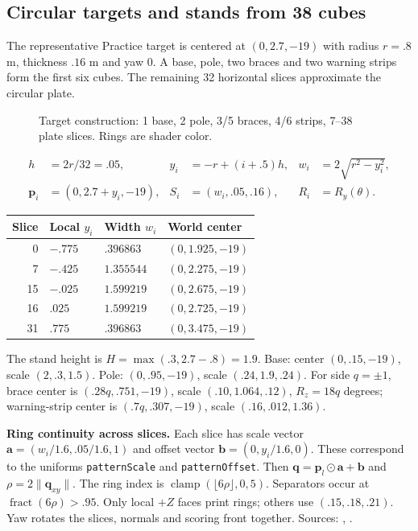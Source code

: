 \subsection{Circular targets and stands from 38 cubes}
The representative Practice target is centered at $(0,2.7,-19)$ with radius $r=.8$ m, thickness $.16$ m and yaw 0. A base, pole, two braces and two warning strips form the first six cubes. The remaining 32 horizontal slices approximate the circular plate.
\begin{figure}[htbp]

\caption{Target construction: 1 base, 2 pole, 3/5 braces, 4/6 strips, 7--38 plate slices. Rings are shader color.}
\end{figure}
\begin{align}
 h&=2r/32=.05, & y_i&=-r+(i+.5)h, & w_i&=2\sqrt{r^2-y_i^2},\\
 \mathbf p_i&=(0,2.7+y_i,-19), & S_i&=(w_i,.05,.16), & R_i&=R_y(\theta).
\end{align}
\begin{center}\begin{tabular}{rlll}\toprule
Slice & Local $y_i$ & Width $w_i$ & World center \\\midrule
0 & $-.775$ & $.396863$ & $(0,1.925,-19)$\\
7 & $-.425$ & $1.355544$ & $(0,2.275,-19)$\\
15 & $-.025$ & $1.599219$ & $(0,2.675,-19)$\\
16 & $.025$ & $1.599219$ & $(0,2.725,-19)$\\
31 & $.775$ & $.396863$ & $(0,3.475,-19)$\\\bottomrule
\end{tabular}\end{center}
The stand height is $H=\max(.3,2.7-.8)=1.9$. Base: center $(0,.15,-19)$, scale $(2,.3,1.5)$. Pole: $(0,.95,-19)$, scale $(.24,1.9,.24)$. For side $q=\pm1$, brace center is $(.28q,.751,-19)$, scale $(.10,1.064,.12)$, $R_z=18q$ degrees; warning-strip center is $(.7q,.307,-19)$, scale $(.16,.012,1.36)$.

\textbf{Ring continuity across slices.} Each slice has scale vector $\mathbf a=(w_i/1.6,.05/1.6,1)$ and offset vector $\mathbf b=(0,y_i/1.6,0)$. These correspond to the uniforms \texttt{patternScale} and \texttt{patternOffset}. Then $\mathbf q=\mathbf p_l\odot\mathbf a+\mathbf b$ and $\rho=2\|\mathbf q_{xy}\|$. The ring index is $\operatorname{clamp}(\lfloor6\rho\rfloor,0,5)$. Separators occur at $\operatorname{fract}(6\rho)>.95$. Only local $+Z$ faces print rings; others use $(.15,.18,.21)$. Yaw rotates the slices, normals and scoring front together. Sources: , .

